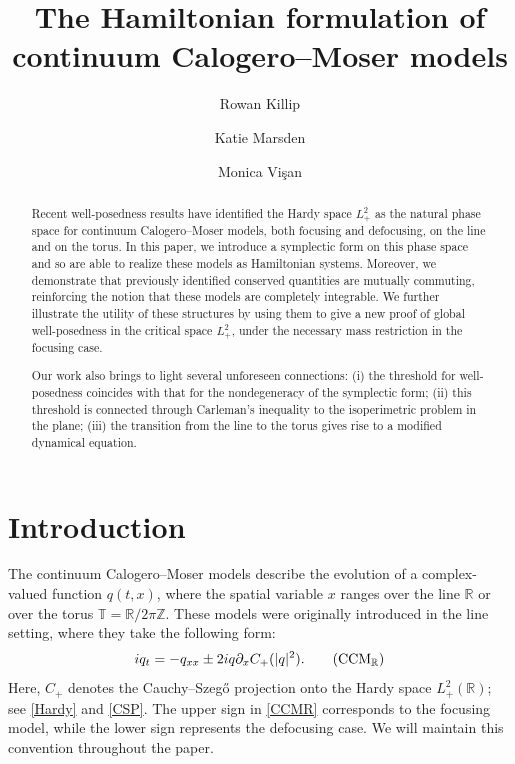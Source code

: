 \documentclass{amsart}
\title[Hamiltonian formulation of CCM models]{The Hamiltonian formulation of\\continuum Calogero--Moser models}
\author[R.~Killip]{Rowan Killip}
\author[K.~Marsden]{Katie Marsden}
\author[M.~Vi\c{s}an]{Monica Vi\c{s}an}
\numberwithin{equation}{section}
\theoremstyle{definition}
\newcommand{\Z}{\mathbb{Z}}
\newcommand{\R}{\mathbb{R}}
\newcommand{\T}{\mathbb{T}}
\newcommand{\dd}{\partial}
\begin{document}
\raggedbottom

\begin{abstract}
Recent well-posedness results have identified the Hardy space $L^2_+$ as the natural phase space for continuum Calogero--Moser models, both focusing and defocusing, on the line and on the torus.  In this paper, we introduce a symplectic form on this phase space and so are able to realize these models as Hamiltonian systems. Moreover, we demonstrate that previously identified conserved quantities are mutually commuting, reinforcing the notion that these models are completely integrable.  We further illustrate the utility of these structures by using them to give a new proof of global well-posedness in the critical space $L^2_+$, under the necessary mass restriction in the focusing case.

Our work also brings to light several unforeseen connections: (i) the threshold for well-posedness coincides with that for the nondegeneracy of the symplectic form; (ii) this threshold is connected through Carleman's inequality to the isoperimetric problem in the plane; (iii) the transition from the line to the torus gives rise to a modified dynamical equation. 
\end{abstract}

\maketitle

\tableofcontents

\section{Introduction}  

The continuum Calogero--Moser models describe the evolution of a complex-valued function $q(t,x)$, where the spatial variable $x$ ranges over the line $\R$ or over the torus $\T=\R/2\pi\Z$.  These models were originally introduced in the line setting, where they take the following form:
\begin{equation}\label{CCMR}
iq_t=-q_{xx}\pm 2iq\dd_x C_+(|q|^2). \tag{CCM${}_\R$}
\end{equation}
Here, $C_+$ denotes the Cauchy--Szeg\H{o} projection onto the Hardy space $L^2_+(\R)$; see \eqref{Hardy} and \eqref{CSP}.  The upper sign in \eqref{CCMR} corresponds to the focusing model, while the lower sign represents the defocusing case.  We will maintain this convention throughout the paper.
\end{document}

